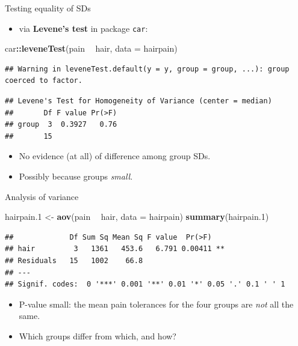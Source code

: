\documentclass[ignorenonframetext,]{beamer}
\newenvironment{Shaded}{\begin{snugshade}}{\end{snugshade}}
\newcommand{\DataTypeTok}[1]{\textcolor[rgb]{0.13,0.29,0.53}{#1}}
\newcommand{\FloatTok}[1]{\textcolor[rgb]{0.00,0.00,0.81}{#1}}
\newcommand{\KeywordTok}[1]{\textcolor[rgb]{0.13,0.29,0.53}{\textbf{#1}}}
\newcommand{\NormalTok}[1]{#1}
\newcommand{\OperatorTok}[1]{\textcolor[rgb]{0.81,0.36,0.00}{\textbf{#1}}}
\newcommand{\StringTok}[1]{\textcolor[rgb]{0.31,0.60,0.02}{#1}}
\providecommand{\tightlist}{%
  \setlength{\itemsep}{0pt}\setlength{\parskip}{0pt}}
\begin{document}
\begin{frame}[fragile]{Testing equality of SDs}
\protect\hypertarget{testing-equality-of-sds}{}

\begin{itemize}
\tightlist
\item
  via \textbf{Levene's test} in package \texttt{car}:
\end{itemize}

\begin{Shaded}
\begin{Highlighting}[]
\NormalTok{car}\OperatorTok{::}\KeywordTok{leveneTest}\NormalTok{(pain }\OperatorTok{~}\StringTok{ }\NormalTok{hair, }\DataTypeTok{data =}\NormalTok{ hairpain)}
\end{Highlighting}
\end{Shaded}

\begin{verbatim}
## Warning in leveneTest.default(y = y, group = group, ...): group coerced to factor.
\end{verbatim}

\begin{verbatim}
## Levene's Test for Homogeneity of Variance (center = median)
##       Df F value Pr(>F)
## group  3  0.3927   0.76
##       15
\end{verbatim}

\begin{itemize}
\item
  No evidence (at all) of difference among group SDs.
\item
  Possibly because groups \emph{small}.
\end{itemize}

\end{frame}

\begin{frame}[fragile]{Analysis of variance}
\protect\hypertarget{analysis-of-variance-1}{}

\begin{Shaded}
\begin{Highlighting}[]
\NormalTok{hairpain}\FloatTok{.1}\NormalTok{ <-}\StringTok{ }\KeywordTok{aov}\NormalTok{(pain }\OperatorTok{~}\StringTok{ }\NormalTok{hair, }\DataTypeTok{data =}\NormalTok{ hairpain)}
\KeywordTok{summary}\NormalTok{(hairpain}\FloatTok{.1}\NormalTok{)}
\end{Highlighting}
\end{Shaded}

\begin{verbatim}
##             Df Sum Sq Mean Sq F value  Pr(>F)   
## hair         3   1361   453.6   6.791 0.00411 **
## Residuals   15   1002    66.8                   
## ---
## Signif. codes:  0 '***' 0.001 '**' 0.01 '*' 0.05 '.' 0.1 ' ' 1
\end{verbatim}

\begin{itemize}
\item
  P-value small: the mean pain tolerances for the four groups are
  \emph{not} all the same.
\item
  Which groups differ from which, and how?
\end{itemize}

\end{frame}
\end{document}
